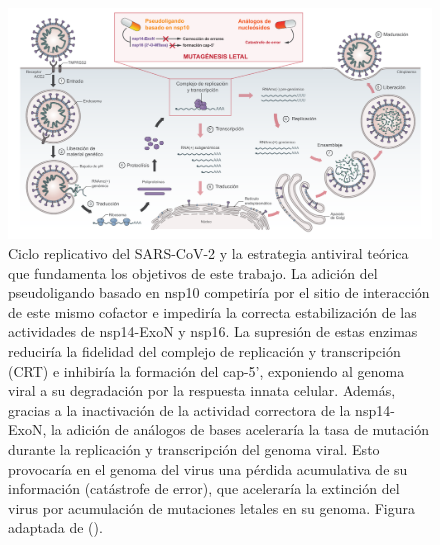 \begin{figure}
    \centering
    \includegraphics[width=1\textwidth]{img/fig3.pdf}
    \caption{Ciclo replicativo del SARS-CoV-2 y la estrategia antiviral 
    teórica que fundamenta los objetivos de este trabajo. La adición del 
    pseudoligando basado en nsp10 competiría por el sitio de interacción de 
    este mismo cofactor e impediría la correcta estabilización de las 
    actividades de nsp14-ExoN y nsp16. La supresión de estas enzimas 
    reduciría la fidelidad del complejo de replicación y transcripción (CRT)
    e inhibiría la formación del cap-5', exponiendo al genoma viral a su 
    degradación por la respuesta innata celular. Además, gracias a la 
    inactivación de la actividad correctora de la nsp14-ExoN, la adición de 
    análogos de bases aceleraría la tasa de mutación durante la replicación 
    y transcripción del genoma viral. Esto provocaría en el genoma del virus
    una pérdida acumulativa de su información (catástrofe de error), que 
    aceleraría la extinción del virus por acumulación de mutaciones letales 
    en su genoma. Figura adaptada de (\cite{asensio_ciclo_2020}).}\label{fig:cycle}
\end{figure}
